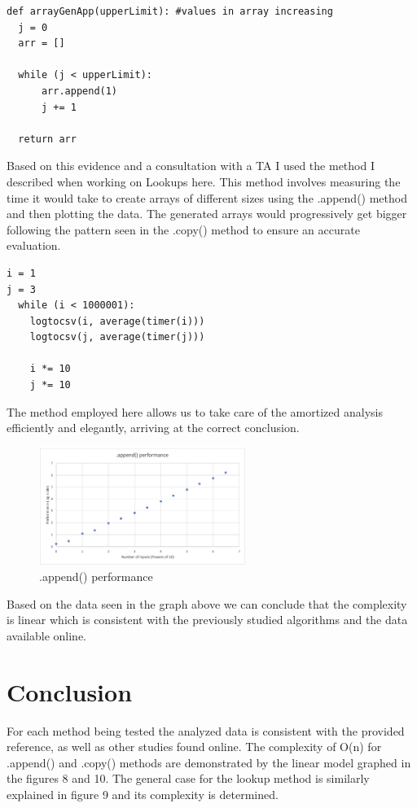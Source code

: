 \documentclass[12pt]{article}
\begin{document}
\footnotesize
\begin{verbatim}
def arrayGenApp(upperLimit): #values in array increasing
  j = 0
  arr = []
  
  while (j < upperLimit):
      arr.append(1)
      j += 1

  return arr
\end{verbatim}
\normalsize

Based on this evidence and a consultation with a TA I used the method I described when working on Lookups here. This method involves measuring the time it would take to create arrays of different sizes using the .append() method and then plotting the data. The generated arrays would progressively get bigger following the pattern seen in the .copy() method to ensure an accurate evaluation.

\footnotesize
\begin{verbatim}
i = 1
j = 3
  while (i < 1000001):
    logtocsv(i, average(timer(i)))
    logtocsv(j, average(timer(j)))
    
    i *= 10
    j *= 10
\end{verbatim}
\normalsize

The method employed here allows us to take care of the amortized analysis efficiently and elegantly, arriving at the correct conclusion. 

\begin{figure}[H]
\centering
\includegraphics[width=0.6\textwidth,height=\textheight,keepaspectratio]{appendgraph.png}
\caption{.append() performance}
\label{Figure: appendgraph}
\end{figure}

Based on the data seen in the graph above we can conclude that the complexity is linear which is consistent with the previously studied algorithms and the data available online.

\section{Conclusion}

For each method being tested the analyzed data is consistent with the provided reference, as well as other studies found online. The complexity of O(n) for .append() and .copy() methods are demonstrated by the linear model graphed in the figures 8 and 10. The general case for the lookup method is similarly explained in figure 9 and its complexity is determined.
\end{document}
